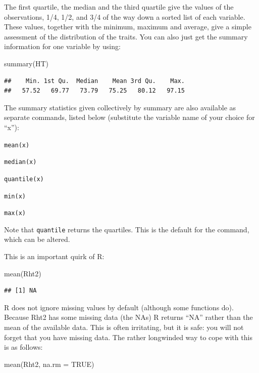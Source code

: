 \documentclass[
]{book}
\newenvironment{Shaded}{\begin{snugshade}}{\end{snugshade}}
\newcommand{\AttributeTok}[1]{\textcolor[rgb]{0.77,0.63,0.00}{#1}}
\newcommand{\ConstantTok}[1]{\textcolor[rgb]{0.00,0.00,0.00}{#1}}
\newcommand{\FunctionTok}[1]{\textcolor[rgb]{0.00,0.00,0.00}{#1}}
\newcommand{\NormalTok}[1]{#1}
\begin{document}
The first quartile, the median and the third quartile give the values of the observations, 1/4, 1/2, and 3/4 of the way down a sorted list of each variable. These values, together with the minimum, maximum and average, give a simple assessment of the distribution of the traits.
You can also just get the summary information for one variable by using:

\begin{Shaded}
\begin{Highlighting}[]
\FunctionTok{summary}\NormalTok{(HT)}
\end{Highlighting}
\end{Shaded}

\begin{verbatim}
##    Min. 1st Qu.  Median    Mean 3rd Qu.    Max. 
##   57.52   69.77   73.79   75.25   80.12   97.15
\end{verbatim}

The summary statistics given collectively by summary are also available as separate commands, listed below (substitute the variable name of your choice for ``x''):

\texttt{mean(x)}

\texttt{median(x)}

\texttt{quantile(x)}

\texttt{min(x)}

\texttt{max(x)}

Note that \texttt{quantile} returns the quartiles. This is the default for the command, which can be altered.

This is an important quirk of R:

\begin{Shaded}
\begin{Highlighting}[]
\FunctionTok{mean}\NormalTok{(Rht2)}
\end{Highlighting}
\end{Shaded}

\begin{verbatim}
## [1] NA
\end{verbatim}

R does not ignore missing values by default (although some functions do). Because Rht2 has some missing data (the NAs) R returns ``NA'' rather than the mean of the available data. This is often irritating, but it is safe: you will not forget that you have missing data. The rather longwinded way to cope with this is as follows:

\begin{Shaded}
\begin{Highlighting}[]
\FunctionTok{mean}\NormalTok{(Rht2, }\AttributeTok{na.rm =} \ConstantTok{TRUE}\NormalTok{)}
\end{Highlighting}
\end{Shaded}
\end{document}
